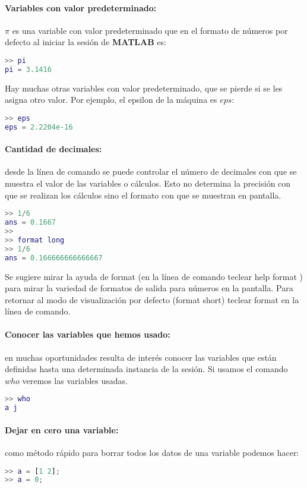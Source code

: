 \paragraph{Variables con valor predeterminado:}$\pi$ es una variable con valor predeterminado que en el formato de números por defecto al iniciar la sesión de \textbf{MATLAB} es:
\begin{lstlisting}[language=Matlab]
>> pi
pi = 3.1416
\end{lstlisting}

Hay muchas otras variables con valor predeterminado, que se pierde si se les asigna otro valor. Por ejemplo, el epsilon de la máquina es $eps$:
\begin{lstlisting}[language=Matlab]
>> eps
eps = 2.2204e-16
\end{lstlisting}

\paragraph{Cantidad de decimales:}desde la línea de comando se puede controlar el número de decimales con que se muestra el valor de las variables o cálculos. Esto no determina la precisión con que se realizan los cálculos sino el formato con que se muestran en pantalla.
\begin{lstlisting}[language=Matlab]
>> 1/6
ans = 0.1667
>>
>> format long
>> 1/6
ans = 0.166666666666667
\end{lstlisting}

Se sugiere mirar la ayuda de format (en la línea de comando teclear help format ) para mirar la variedad de formatos de salida para números en la pantalla. Para retornar al modo de visualización por defecto (format short) teclear format en la línea de comando.

\paragraph{Conocer las variables que hemos usado:}en muchas oportunidades resulta de interés conocer las variables que están definidas hasta una determinada instancia de la sesión. Si usamos el comando $who$ veremos las variables usadas.
\begin{lstlisting}[language=Matlab]
>> who
a j
\end{lstlisting}

\paragraph{Dejar en cero una variable:}como método rápido para borrar todos los datos de una variable podemos hacer:
\begin{lstlisting}[language=Matlab]
>> a = [1 2];
>> a = 0;
\end{lstlisting}

